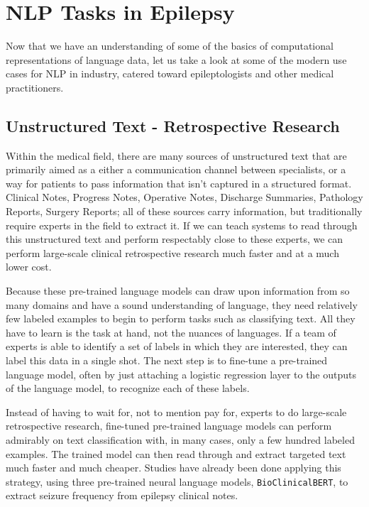 \section{NLP Tasks in Epilepsy}

Now that we have an understanding of some of the basics of computational representations of language data, let us take a look at some of the modern use cases for NLP in industry, catered toward epileptologists and other medical practitioners.

\subsection{Unstructured Text - Retrospective Research}
Within the medical field, there are many sources of unstructured text that are primarily aimed as a either a communication channel between specialists, or a way for patients to pass information that isn't captured in a structured format.
Clinical Notes, Progress Notes, Operative Notes, Discharge Summaries, Pathology Reports, Surgery Reports; all of these sources carry information, but traditionally require experts in the field to extract it.
If we can teach systems to read through this unstructured text and perform respectably close to these experts, we can perform large-scale clinical retrospective research much faster and at a much lower cost.

Because these pre-trained language models can draw upon information from so many domains and have a sound understanding of language, they need relatively few
labeled examples to begin to perform tasks such as classifying text. All they have to learn is the task at hand, not the nuances of languages.
If a team of experts is able to identify a set of labels in which they are interested, they can label this data in a single shot. The next step is to fine-tune a pre-trained language model, often by just attaching a logistic regression layer to the outputs of the language model,
to recognize each of these labels.

Instead of having to wait for, not to mention pay for, experts to do large-scale retrospective research, fine-tuned pre-trained language models can perform admirably on text classification with, in many cases, only a few hundred labeled examples.
The trained model can then read through and extract targeted text much faster and much cheaper.
Studies have already been done applying this strategy, using three pre-trained neural language models, \texttt{Bio\textunderscore ClinicalBERT}, to extract
seizure frequency from epilepsy clinical notes.\cite{10.1093/jamia/ocac018}

